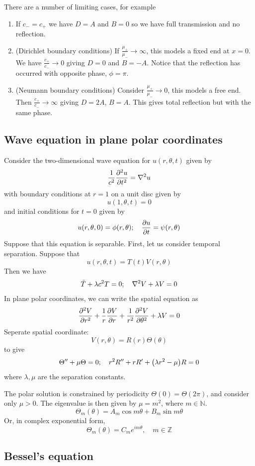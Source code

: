 \documentclass[a4paper]{article}
\begin{document}
There are a number of limiting cases, for example
\begin{enumerate}
	\item If \( c_- = c_+ \) we have \( D = A \) and \( B = 0 \) so we have full transmission and no reflection.
	\item (Dirichlet boundary conditions) If \( \frac{\mu_+}{\mu_-} \to \infty \), this models a fixed end at \( x = 0 \).
	      We have \( \frac{c_+}{c_-} \to 0 \) giving \( D = 0 \) and \( B = -A \).
	      Notice that the reflection has occurred with opposite phase, \( \phi = \pi \).
	\item (Neumann boundary conditions) Consider \( \frac{\mu_+}{\mu_-} \to 0 \), this models a free end.
	      Then \( \frac{c_+}{c_-} \to \infty \) giving \( D = 2A \), \( B = A \).
	      This gives total reflection but with the same phase.
\end{enumerate}

\subsection{Wave equation in plane polar coordinates}
Consider the two-dimensional wave equation for \( u(r,\theta,t) \) given by
\[
	\frac{1}{c^2} \pdv[2]{u}{t} = \laplacian u
\]
with boundary conditions at \( r = 1 \) on a unit disc given by
\[
	u(1,\theta,t) = 0
\]
and initial conditions for \( t = 0 \) given by
\[
	u(r,\theta,0) = \phi(r,\theta);\quad \pdv{u}{t}(r,\theta,0) = \psi(r,\theta)
\]
Suppose that this equation is separable.
First, let us consider temporal separation.
Suppose that
\[
	u(r,\theta,t) = T(t) V(r,\theta)
\]
Then we have
\[
	\ddot T + \lambda c^2 T = 0;\quad \laplacian V + \lambda V = 0
\]
In plane polar coordinates, we can write the spatial equation as
\[
	\pdv[2]{V}{r} + \frac{1}{r} \pdv{V}{r} + \frac{1}{r^2}\pdv[2]{V}{\theta} + \lambda V = 0
\]
Seperate spatial coordinate:
\[
	V(r,\theta) = R(r) \Theta(\theta)
\]
to give
\[
	\Theta'' + \mu \Theta = 0;\quad r^2 R'' + r R' + \qty(\lambda r^2 - \mu) R = 0
\]
where \( \lambda, \mu \) are the separation constants.

The polar solution is constrained by periodicity \( \Theta(0) = \Theta(2 \pi) \),
and consider only \( \mu > 0 \).
The eigenvalue is then given by \( \mu = m^2 \), where \( m \in \mathbb N \).
\[
	\Theta_m(\theta) = A_m \cos m \theta + B_m \sin m \theta
\]
Or, in complex exponential form,
\[
	\Theta_m(\theta) = C_m e^{im\theta},\quad m \in \mathbb Z
\]

\subsection{Bessel's equation}
\end{document}
